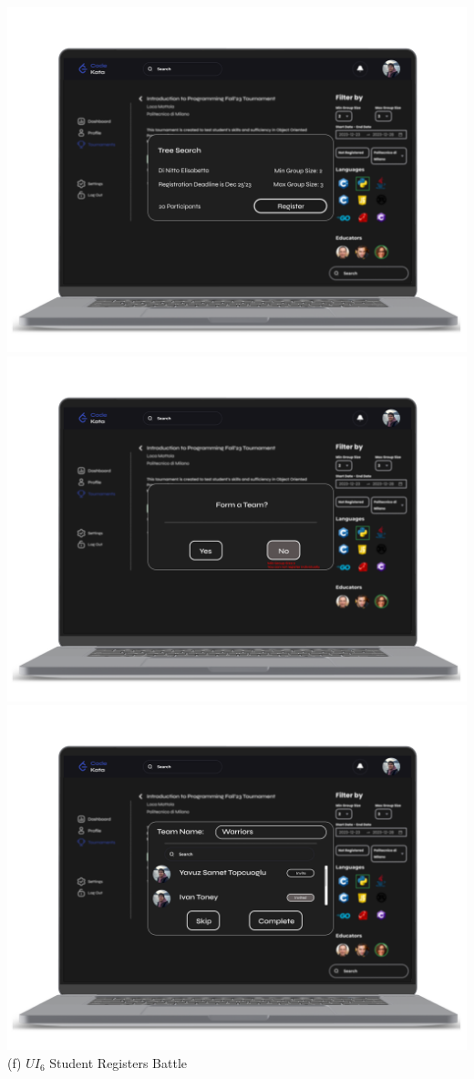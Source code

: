 \newpage
\begin{center}
\includegraphics[scale=0.13]{Images/ui-ux/student_battle_register_1.png}
\includegraphics[scale=0.13]{Images/ui-ux/student_battle_register_2.png}
\includegraphics[scale=0.13]{Images/ui-ux/student_battle_register_3.png}
\\ (f) $UI_{6}$  Student Registers Battle 
\end{center}
